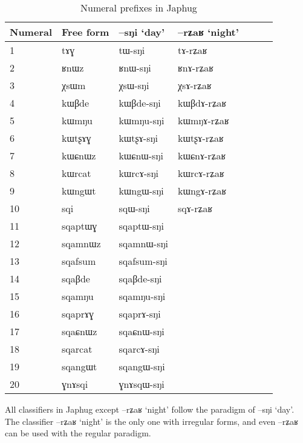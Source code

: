 \documentclass[oldfontcommands,oneside,a4paper,12pt]{article}
\newcommand{\ipa}[1]{{\phon#1}}
\begin{document}
 \begin{table}[H]
\caption{Numeral prefixes in Japhug}  \label{tab:num.prefix} \centering
\begin{tabular}{lllllll}
\toprule
Numeral & Free form &  \ipa{--sŋi} `day' &  \ipa{--rʑaʁ} `night' \\
\midrule
 1	&	\ipa{tɤɣ}  &	\ipa{tɯ-sŋi}  &	\ipa{tɤ-rʑaʁ}  &	\\
2	&	\ipa{ʁnɯz}  &	\ipa{ʁnɯ-sŋi}  &	\ipa{ʁnɤ-rʑaʁ}  &	\\
3	&	\ipa{χsɯm}  &	\ipa{χsɯ-sŋi}  &	\ipa{χsɤ-rʑaʁ}  &	\\
4	&	\ipa{kɯβde}  &	\ipa{kɯβde-sŋi}  &	\ipa{kɯβdɤ-rʑaʁ}  &	\\
5	&	\ipa{kɯmŋu}  &	\ipa{kɯmŋu-sŋi}  &	\ipa{kɯmŋɤ-rʑaʁ}  &	\\
6	&	\ipa{kɯtʂɤɣ}  &	\ipa{kɯtʂɤ-sŋi}  &	\ipa{kɯtʂɤ-rʑaʁ}  &	\\
7	&	\ipa{kɯɕnɯz}  &	\ipa{kɯɕnɯ-sŋi}  &	\ipa{kɯɕnɤ-rʑaʁ}  &	\\
8	&	\ipa{kɯrcat}  &	\ipa{kɯrcɤ-sŋi}  &	\ipa{kɯrcɤ-rʑaʁ}  &	\\
9	&	\ipa{kɯngɯt}  &	\ipa{kɯngɯ-sŋi}  &	\ipa{kɯngɤ-rʑaʁ}  &	\\
10	&	\ipa{sqi}  &	\ipa{sqɯ-sŋi}  &\ipa{sqɤ-rʑaʁ}  &	\\
\midrule
11	&	\ipa{sqaptɯɣ}  &	\ipa{sqaptɯ-sŋi}  &	\\
12	&	\ipa{sqamnɯz}  &	\ipa{sqamnɯ-sŋi}  &	\\
13	&	\ipa{sqafsum}  &	\ipa{sqafsum-sŋi}  &	\\
14	&	\ipa{sqaβde}  &	\ipa{sqaβde-sŋi}  &	\\
15	&	\ipa{sqamŋu}  &	\ipa{sqamŋu-sŋi}  &	\\
16	&	\ipa{sqaprɤɣ}  &	\ipa{sqaprɤ-sŋi}  &	\\
17	&	\ipa{sqaɕnɯz}  &	\ipa{sqaɕnɯ-sŋi}  &	\\
18	&	\ipa{sqarcat}  &	\ipa{sqarcɤ-sŋi}  &	\\
19	&	\ipa{sqangɯt}  &	\ipa{sqangɯ-sŋi}  &	\\
20	&	\ipa{ɣnɤsqi}  &	\ipa{ɣnɤsqɯ-sŋi}  &	\\
\bottomrule
\end{tabular}
\end{table}
All classifiers in Japhug except \ipa{--rʑaʁ} `night' follow the paradigm of \ipa{--sŋi} `day'. The classifier \ipa{--rʑaʁ} `night' is the only one with irregular forms, and even  \ipa{--rʑaʁ} can be used with the regular paradigm.
 
\end{document}
